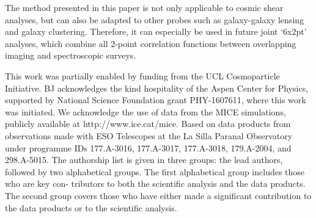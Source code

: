 \documentclass{aa}
\begin{document}
The method presented in this paper is not only applicable to cosmic shear analyses, but can also be adapted to other probes such as galaxy-galaxy lensing and galaxy clustering. Therefore, it can especially be used in future joint `6x2pt' analyses, which combine all 2-point correlation functions between overlapping imaging and spectroscopic surveys.
\begin{acknowledgements}
This work was partially enabled by funding from the UCL Cosmoparticle Initiative.
BJ acknowledges the kind hospitality of the Aspen Center for Physics, supported by National Science Foundation grant PHY-1607611, where this work was initiated.
We acknowledge the use of data from the MICE simulations, publicly available at http://www.ice.cat/mice.
Based on data products from observations made with ESO Telescopes at the La Silla Paranal Observatory under programme IDs 177.A-3016, 177.A-3017, 177.A-3018, 179.A-2004, and 298.A-5015. The authorship list is given in three groups: the lead authors, followed by two alphabetical groups. The first alphabetical group includes those who are key con- tributors to both the scientific analysis and the data products. The second group covers those who have either made a significant contribution to the data products or to the scientific analysis.
\end{acknowledgements}




\end{document}
